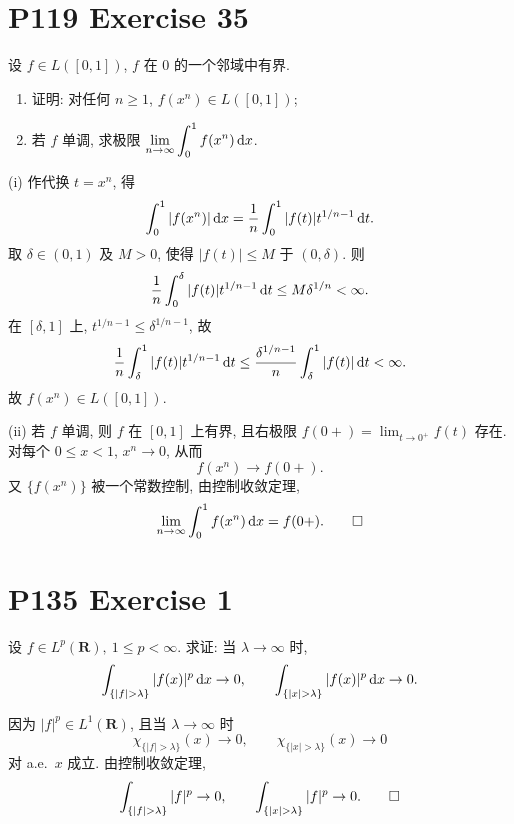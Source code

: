 \documentclass{article}
\begin{document}
\section{P119 Exercise 35}

设 $f\in L([0,1])$, $f$ 在 $0$ 的一个邻域中有界.
\begin{enumerate}
  \renewcommand{\labelenumi}{(\roman{enumi})}
  \item 证明: 对任何 $n\ge1$, $f(x^n)\in L([0,1])$;
  \item 若 $f$ 单调, 求极限 $\displaystyle\lim_{n\to\infty}\int_0^1f(x^n)\,\mathrm{d} x$.
\end{enumerate}

\begin{solution}
  (i)\; 作代换 $t=x^n$, 得
  \[
    \int_0^1|f(x^n)|\,\mathrm{d} x
    =\frac1n\int_0^1|f(t)|t^{1/n-1}\,\mathrm{d} t.
  \]
  取 $\delta\in(0,1)$ 及 $M>0$, 使得 $|f(t)|\le M$ 于
  $(0,\delta)$. 则
  \[
    \frac1n\int_0^\delta|f(t)|t^{1/n-1}\,\mathrm{d} t
    \le M\delta^{1/n}<\infty.
  \]
  在 $[\delta,1]$ 上, $t^{1/n-1}\le\delta^{1/n-1}$, 故
  \[
    \frac1n\int_\delta^1|f(t)|t^{1/n-1}\,\mathrm{d} t
    \le\frac{\delta^{1/n-1}}n\int_\delta^1|f(t)|\,\mathrm{d} t<\infty.
  \]
  故 $f(x^n)\in L([0,1])$.

  (ii)\; 若 $f$ 单调, 则 $f$ 在 $[0,1]$ 上有界, 且右极限
  $f(0+)=\lim_{t\to0^+}f(t)$ 存在. 对每个 $0\le x<1$,
  $x^n\to0$, 从而
  \[
    f(x^n)\longrightarrow f(0+).
  \]
  又 $\{f(x^n)\}$ 被一个常数控制, 由控制收敛定理,
  \[
    \lim_{n\to\infty}\int_0^1f(x^n)\,\mathrm{d} x=f(0+).
    \qed
  \]
\end{solution}

\section{P135 Exercise 1}

设 $f\in L^p(\mathbf R),\ 1\le p<\infty$. 求证: 当 $\lambda\to\infty$ 时,
\[
  \int_{\{|f|>\lambda\}}|f(x)|^p\,\dif x\to0,\qquad
  \int_{\{|x|>\lambda\}}|f(x)|^p\,\dif x\to0.
\]

\begin{solution}
  因为 $|f|^p\in L^1(\mathbf R)$, 且当 $\lambda\to\infty$ 时
  \[
    \chi_{\{|f|>\lambda\}}(x)\to0,\qquad
    \chi_{\{|x|>\lambda\}}(x)\to0
  \]
  对 a.e.\ $x$ 成立. 由控制收敛定理,
  \[
    \int_{\{|f|>\lambda\}}|f|^p\to0,\qquad
    \int_{\{|x|>\lambda\}}|f|^p\to0. \qed
  \]
\end{solution}
\end{document}
